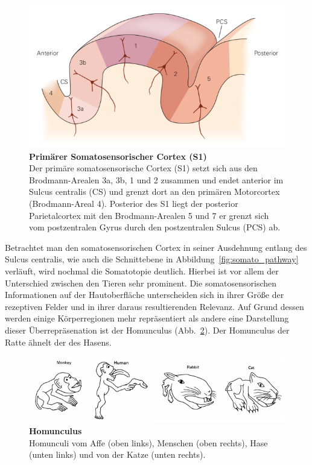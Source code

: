 \documentclass[12pt,a4paper,pdftex]{article}
\begin{document}
\begin{figure}[H]
    \centering
    \includegraphics{pictures/somatosensory/S1_Cortex.png}
    \caption[Primärer Somatosensorischer Cortex]{\textbf{Primärer Somatosensorischer Cortex (S1)}\\
    Der primäre somatosensorische Cortex (S1) setzt sich aus den Brodmann-Arealen 3a, 3b, 1 und 2 zusammen und endet anterior im Sulcus centralis (CS) und grenzt dort an den primären Motorcortex (Brodmann-Areal 4). Posterior des S1 liegt der posterior Parietalcortex mit den Brodmann-Arealen 5 und 7 er grenzt sich vom postzentralen Gyrus durch den postzentralen Sulcus (PCS) ab.\\
    \textsuperscript{\cite[23]{kandel2013principles}}}
    \label{fig:S1_Cortex}
\end{figure}

Betrachtet man den somatosensorischen Cortex in seiner Ausdehnung entlang des Sulcus centralis, wie auch die Schnittebene in Abbildung~\ref{fig:somato_pathway} verläuft, wird nochmal die Somatotopie deutlich. Hierbei ist vor allem der Unterschied zwischen den Tieren sehr prominent. Die somatosensorischen Informationen auf der Hautoberfläche unterscheiden sich in ihrer Größe der rezeptiven Felder und in ihrer daraus resultierenden Relevanz. Auf Grund dessen werden einige Körperregionen mehr repräsentiert als andere eine Darstellung dieser Überrepräsenation ist der Homunculus (Abb.~\ref{fig:somato_homunculus}). Der Homunculus der Ratte ähnelt der des Hasens. 
\\

\begin{figure}[H]
    \centering
    \includegraphics{pictures/somatosensory/homunculus.png}
    \caption[Homunculus]{\textbf{Homunculus}\\
    Homunculi vom Affe (oben links), Menschen (oben rechts), Hase (unten links) und von der Katze (unten rechts).}
    \label{fig:somato_homunculus}
\end{figure}
\end{document}
